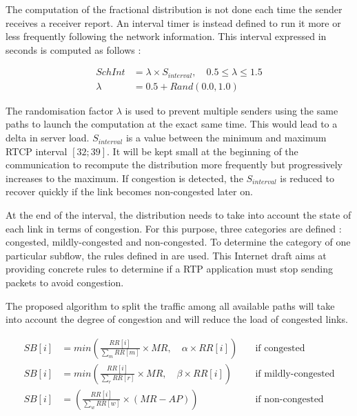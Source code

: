 The computation of the fractional distribution is not done each time the sender receives a receiver report. An interval timer is instead defined to run it more or less frequently following the network information. This interval expressed in seconds is computed as follows : 

\begin{equation*}
\begin{split}
SchInt & = \lambda \times S_{interval},\quad 0.5 \le \lambda \le 1.5 \\
 \lambda & = 0.5 + Rand(0.0,1.0)
\end{split}
\end{equation*}

The randomisation factor $\lambda$ is used to prevent multiple senders using the same paths to launch the computation at the exact same time. This would lead to a delta in server load. $S_{interval}$ is a value between the minimum and maximum RTCP interval $[32;39]$. It will be kept small at the beginning of the communication to recompute the distribution more frequently but progressively increases to the maximum. If congestion is detected, the $S_{interval}$ is reduced to recover quickly if the link becomes non-congested later on.

At the end of the interval, the distribution needs to take into account the state of each link in terms of congestion. For this purpose, three categories are defined : congested, mildly-congested and non-congested. To determine the category of one particular subflow, the rules defined in \cite{ietf-avtcore-rtp-circuit-breakers} are used. This Internet draft aims at providing concrete rules to determine if a RTP application must stop sending packets to avoid congestion.

The proposed algorithm to split the traffic among all available paths will take into account the degree of congestion and will reduce the load of congested links.

\begin{align*}
SB[i] & = min\left( \frac{RR[i]}{\sum_{m} RR[m]} \times MR,\quad \alpha \times RR[i] \right) &\quad \text{if congested} \\
SB[i] & = min\left( \frac{RR[i]}{\sum_{r} RR[r]} \times MR,\quad \beta \times RR[i] \right) &\quad \text{if mildly-congested} \\
SB[i] & = \left( \frac{RR[i]}{\sum_{w} RR[w]} \times (MR - AP) \right) & \quad \text{if non-congested}
\end{align*}

